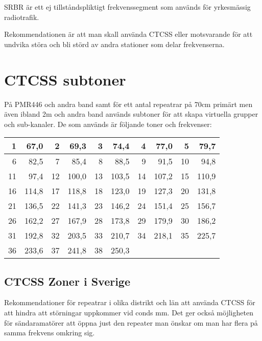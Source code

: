 \documentclass[10pt,swedish,a4paper]{article}
\begin{document}
SRBR är ett ej tillståndspliktigt frekvenssegment som används för yrkesmässig radiotrafik.

Rekommendationen är att man skall använda CTCSS eller motsvarande för att undvika störa och bli störd av andra stationer som delar frekvenserna.

\section{CTCSS subtoner}

På PMR446 och andra band samt för ett antal repeatrar på 70cm primärt men även ibland 2m och andra band används subtoner för att skapa virtuella grupper och sub-kanaler. De som används är följande toner och frekvenser:

\begin{tabular}{rr|rr|rr|rr|rr}
	 1 &  67,0 &  2 &  69,3 &  3 &  74,4 &  4 &  77,0 &  5 &  79,7 \\ \hline
	 6 &  82,5 &  7 &  85,4 &  8 &  88,5 &  9 &  91,5 & 10 &  94,8 \\ \hline
	11 &  97,4 & 12 & 100,0 & 13 & 103,5 & 14 & 107,2 & 15 & 110,9 \\ \hline
	16 & 114,8 & 17 & 118,8 & 18 & 123,0 & 19 & 127,3 & 20 & 131,8 \\ \hline
	21 & 136,5 & 22 & 141,3 & 23 & 146,2 & 24 & 151,4 & 25 & 156,7 \\ \hline
	26 & 162,2 & 27 & 167,9 & 28 & 173,8 & 29 & 179,9 & 30 & 186,2 \\ \hline
	31 & 192,8 & 32 & 203,5 & 33 & 210,7 & 34 & 218,1 & 35 & 225,7 \\ \hline
	36 & 233,6 & 37 & 241,8 & 38 & 250,3 &    &       &    &
\end{tabular}

\subsection{CTCSS Zoner i Sverige}

Rekommendationer för repeatrar i olika distrikt och län att använda CTCSS för att hindra att störningar uppkommer vid conds mm. Det ger också möjligheten för sändaramatörer att öppna just den repeater man önskar om man har flera på samma frekvens omkring sig.
\end{document}
